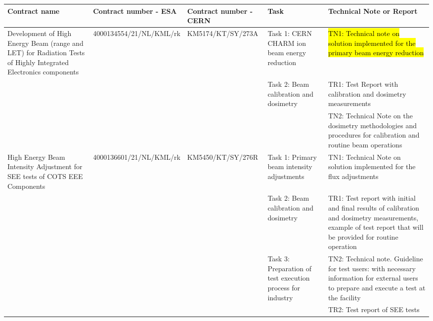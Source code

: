 \documentclass{cernatsnote}
\begin{document}
\begin{table}[!htp]
\centering
{\tiny
\begin{tabular}{@{}p{2.5cm}p{2cm}p{2cm}p{2.4cm}p{5cm}@{}}
\toprule
Contract name & Contract number - ESA & Contract number - CERN & Task & Technical Note or Report \\
\midrule
Development of High Energy Beam (range and LET) for Radiation Tests of Highly Integrated Electronics components &
4000134554\linebreak/21/NL/KML/rk &
KM5174\linebreak/KT/SY/273A &
Task 1: CERN CHARM ion beam energy reduction &
\hl{TN1: Technical note on solution implemented for the primary beam energy reduction}\\
&  &  & Task 2: Beam calibration and dosimetry & TR1: Test Report with calibration and dosimetry measurements\\
 &  &  &  & TN2: Technical Note on the dosimetry methodologies and procedures for calibration and routine beam operations\\
High Energy Beam Intensity Adjustment for SEE tests of COTS EEE Components & 4000136601\linebreak/21/NL/KML/rk & KM5450\linebreak/KT/SY/276R & Task 1: Primary beam intensity adjustments & TN1: Technical Note on solution implemented for the flux adjustments\\
 &  &  & Task 2: Beam calibration and dosimetry & TR1: Test report with initial and final results of calibration and dosimetry measurements, example of test report that will be provided for routine operation\\
 &  &  & Task 3: Preparation of test execution process for industry & TN2: Technical note. Guideline for test users: with necessary information for external users to prepare and execute a test at the facility\\
 &  &  &  & TR2: Test report of SEE tests\\
 \bottomrule
\end{tabular}
}
\end{table}

\newpage

\begingroup
\color{black}
\tableofcontents
\endgroup

\pagebreak
\end{document}

